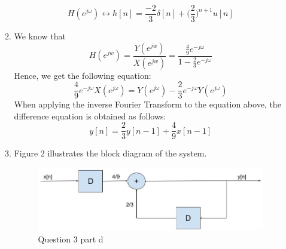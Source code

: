 \documentclass[10pt,a4paper, margin=1in]{article}
\begin{document}
\begin{enumerate}
\begin{enumerate}
    $$H(e^{j\omega}) \longleftrightarrow h[n]=\frac{-2}{3}\delta[n]+\biggl(\frac{2}{3}\biggr)^{n+1}u[n]$$
    \item %
    We know that
    $$H(e^{jw}) = \frac{Y(e^{jw})}{X(e^{jw})} = \frac{\frac{4}{9}e^{-j\omega}}{1-\frac{2}{3}e^{-j\omega}}$$
    Hence, we get the following equation:
    $$\frac{4}{9}e^{-j\omega}X(e^{j\omega})=Y(e^{j\omega})-\frac{2}{3}e^{-j\omega}Y(e^{j\omega})$$
    When applying the inverse Fourier Transform to the equation above, the difference equation is obtained as follows:
    $$y[n]=\frac{2}{3}y[n-1]+\frac{4}{9}x[n-1]$$
    \item %
    Figure 2 illustrates the block diagram of the system.
        \begin{figure}[htbp]
            \centering
            \includegraphics[width=1\linewidth]{q3d.jpg}
            \caption{Question 3 part d}
            \label{fig:q3d}
        \end{figure}\vspace{0.3cm}
    \end{enumerate}


\end{enumerate}
\end{document}
